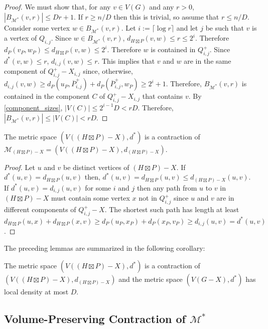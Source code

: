 \documentclass{patmorin}
\renewcommand{\ge}{\geqslant}
\renewcommand{\le}{\leqslant}
\begin{document}
\begin{proof}
  We must show that, for any $v\in V(G)$ and any $r>0$, $|B_{\mathcal{M}^*}(v,r)|\le Dr+1$.  If $r\ge n/D$ then this is trivial, so assume that $r\le n/D$.  Consider some vertex $w\in B_{\mathcal{M}^*}(v,r)$.  Let $i:=\lceil\log r\rceil$ and let $j$ be such that $v$ is a vertex of $Q_{i,j}$.  Since $w\in B_{\mathcal{M}^*}(v,r)$, $d_{H\boxtimes P}(v,w)\le r\le 2^i$.  Therefore $d_P(v_P,w_P)\le d_{H\boxtimes P}(v,w)\le 2^i$.  Therefore $w$ is contained in $Q^+_{i,j}$.  Since $d^*(v,w)\le r$, $d_{i,j}(v,w)\le r$.  This implies that $v$ and $w$ are in the same component of $Q^+_{i,j}-X_{i,j}$ since, otherwise, $d_{i,j}(v,w)\ge d_P(u_P,\overline{P}^+_{i,j}) + d_P(\overline{P}^+_{i,j},w_P)\ge 2^i+1$.
  Therefore, $B_{\mathcal{M}^*}(v,r)$ is contained in the component $C$ of $Q^+_{i,j}-X_{i,j}$ that contains $v$.  By \cref{component_sizes}, $|V(C)|\le 2^{i-1}D< rD$.  Therefore, $|B_{\mathcal{M}^*}(v,r)|\le |V(C)|< rD$.
\end{proof}

\begin{lem}
  The metric space $(V((H\boxtimes P)-X),d^*)$ is a contraction of $\mathcal{M}_{(H\boxtimes P)-X}=(V((H\boxtimes P)-X),d_{(H\boxtimes P)-X})$.
\end{lem}

\begin{proof}
  Let $u$ and $v$ be distinct vertices of $(H\boxtimes P)-X$.  If $d^*(u,v)=d_{H\boxtimes P}(u,v)$ then, $d^*(u,v)=d_{H\boxtimes P}(u,v)\le d_{(H\boxtimes P)-X}(u,v)$.  If $d^*(u,v)=d_{i,j}(u,v)$ for some $i$ and $j$ then any path from $u$ to $v$ in $(H\boxtimes P)-X$ must contain some vertex $x$ not in $Q^+_{i,j}$ since $u$ and $v$ are in different components of $Q^+_{i,j}-X$.  The shortest such path has length at least $d_{H\boxtimes P}(u,x)+d_{H\boxtimes P}(x,v) \ge d_P(u_P,x_P)+d_P(x_P,v_P) \ge d_{i,j}(u,v)=d^*(u,v)$.
\end{proof}

The preceding lemmas are summarized in the following corollary:

\begin{cor}\label{d_star_summary}
  The metric space $(V((H\boxtimes P)-X), d^*)$ is a  contraction of $(V((H\boxtimes P)-X), d_{(H\boxtimes P)-X})$ and the metric space $(V(G-X),d^*)$ has local density at most $D$.
\end{cor}



\subsection{Volume-Preserving Contraction of $\mathcal{M}^*$}
\end{document}
